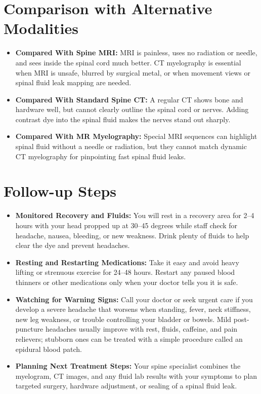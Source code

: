 \section{Comparison with Alternative Modalities}
\begin{itemize}
    \item \textbf{Compared With Spine MRI:} MRI is painless, uses no radiation or needle, and sees inside the spinal cord much better. CT myelography is essential when MRI is unsafe, blurred by surgical metal, or when movement views or spinal fluid leak mapping are needed.
    \item \textbf{Compared With Standard Spine CT:} A regular CT shows bone and hardware well, but cannot clearly outline the spinal cord or nerves. Adding contrast dye into the spinal fluid makes the nerves stand out sharply.
    \item \textbf{Compared With MR Myelography:} Special MRI sequences can highlight spinal fluid without a needle or radiation, but they cannot match dynamic CT myelography for pinpointing fast spinal fluid leaks.
\end{itemize}

\section{Follow-up Steps}
\begin{itemize}
    \item \textbf{Monitored Recovery and Fluids:} You will rest in a recovery area for 2--4 hours with your head propped up at 30--45 degrees while staff check for headache, nausea, bleeding, or new weakness. Drink plenty of fluids to help clear the dye and prevent headaches.
    \item \textbf{Resting and Restarting Medications:} Take it easy and avoid heavy lifting or strenuous exercise for 24--48 hours. Restart any paused blood thinners or other medications only when your doctor tells you it is safe.
    \item \textbf{Watching for Warning Signs:} Call your doctor or seek urgent care if you develop a severe headache that worsens when standing, fever, neck stiffness, new leg weakness, or trouble controlling your bladder or bowels. Mild post-puncture headaches usually improve with rest, fluids, caffeine, and pain relievers; stubborn ones can be treated with a simple procedure called an epidural blood patch.
    \item \textbf{Planning Next Treatment Steps:} Your spine specialist combines the myelogram, CT images, and any fluid lab results with your symptoms to plan targeted surgery, hardware adjustment, or sealing of a spinal fluid leak.
\end{itemize}

